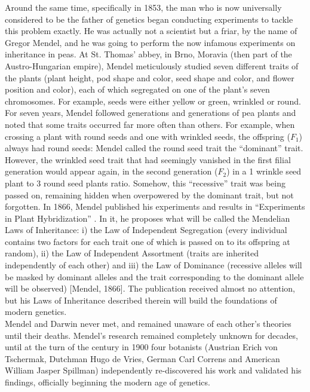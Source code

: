 Around the same time, specifically in 1853, the man who is now universally considered to be the father of genetics began conducting experiments to tackle this problem exactly. 
He was actually not a scientist but a friar, by the name of Gregor Mendel, and he was going to perform the now infamous experiments on inheritance in peas. 
At St. Thomas’ abbey, in Brno, Moravia (then part of the Austro-Hungarian empire), Mendel meticulously studied seven different traits of the plants (plant height, pod shape and color, seed shape and color, and flower position and color), each of which segregated on one of the plant's seven chromosomes. 
For example, seeds were either yellow or green, wrinkled or round. For seven years, Mendel followed generations and generations of pea plants and noted that some traits occurred far more often than others. 
For example, when crossing a plant with round seeds and one with wrinkled seeds, the offspring ($F_1$) always had round seeds: Mendel called the round seed trait the “dominant” trait. However, the wrinkled seed trait that had seemingly vanished in the first filial generation would appear again, in the second generation ($F_2$) in a 1 wrinkle seed plant to 3 round seed plants ratio. Somehow, this “recessive” trait was being passed on, remaining hidden when overpowered by the dominant trait, but not forgotten. 
In 1866, Mendel published his experiments and results in “Experiments in Plant Hybridization” \cite{mendel1996experiments}. 
In it, he proposes what will be called the Mendelian Laws of Inheritance: i) the Law of Independent Segregation (every individual contains two factors for each trait one of which is passed on to its offspring at random), ii) the Law of Independent Assortment (traits are inherited independently of each other) and iii) the Law of Dominance (recessive alleles will be masked by dominant alleles and the trait corresponding to the dominant allele will be observed) [Mendel, 1866]. 
The publication received almost no attention, but his Laws of Inheritance described therein will build the foundations of modern genetics.\\

Mendel and Darwin never met, and remained unaware of each other’s theories until their deaths. Mendel’s research remained completely unknown for decades, until at the turn of the century in 1900 four botanists (Austrian Erich von Tschermak, Dutchman Hugo de Vries, German Carl Correns and American William Jasper Spillman) independently re-discovered his work and validated his findings, officially beginning the modern age of genetics.\\ 

